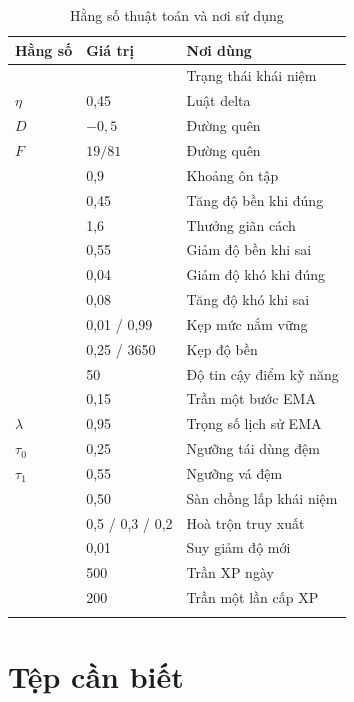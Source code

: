 \begin{longtable}{L{5.4cm} L{2.6cm} L{5.6cm}}
\toprule
\textbf{Hằng số} & \textbf{Giá trị} & \textbf{Nơi dùng}\\
\midrule
\endhead
{} &  & Trạng thái khái niệm\\
 \(\eta\) & 0,45 & Luật delta\\
 \(D\) & \(-0{,}5\) & Đường quên\\
 \(F\) & \(19/81\) & Đường quên\\
 & 0,9 & Khoảng ôn tập\\
 & 0,45 & Tăng độ bền khi đúng\\
 & 1,6 & Thưởng giãn cách\\
 & 0,55 & Giảm độ bền khi sai\\
 & 0,04 & Giảm độ khó khi đúng\\
 & 0,08 & Tăng độ khó khi sai\\
 & 0,01 / 0,99 & Kẹp mức nắm vững\\
 & 0,25 / 3650 & Kẹp độ bền\\
 & 50 & Độ tin cậy điểm kỹ năng\\
 & 0,15 & Trần một bước EMA\\
 \(\lambda\) & 0,95 & Trọng số lịch sử EMA\\
 \(\tau_0\) & 0,25 & Ngưỡng tái dùng đệm\\
 \(\tau_1\) & 0,55 & Ngưỡng vá đệm\\
 & 0,50 & Sàn chồng lấp khái niệm\\
 & 0,5 / 0,3 / 0,2 & Hoà trộn truy xuất\\
 & 0,01 & Suy giảm độ mới\\
 & 500 & Trần XP ngày\\
 & 200 & Trần một lần cấp XP\\
\bottomrule
\caption{Hằng số thuật toán và nơi sử dụng}
\label{tab:hangso}
\end{longtable}

\section{Tệp cần biết}

